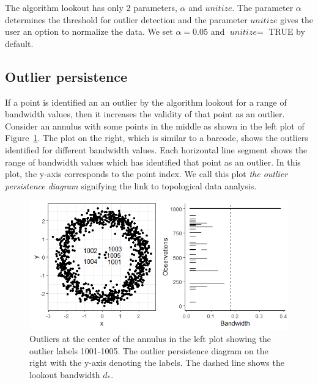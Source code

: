 \documentclass[letter,12pt]{article}
\begin{document}
The algorithm lookout has only 2 parameters, $\alpha$ and $\textit{unitize}$. The parameter $\alpha$ determines the threshold for outlier detection and the parameter $\textit{unitize}$ gives the user an option to normalize the data. We set $\alpha= 0.05$ and $\textit{unitize} =$ TRUE by default.


\subsection{Outlier persistence}\label{subsec:persistence}
If a point is identified an an outlier by the algorithm lookout for a range of bandwidth values, then it increases the validity of that point as an outlier. Consider an annulus with some points in the middle as shown in the left plot of Figure~\ref{fig:outlierpersistence}. The plot on the right, which is similar to a barcode,  shows the outliers identified for different bandwidth values. Each horizontal line segment shows the range of bandwidth values which has identified that point as an outlier. 
In this plot, the y-axis corresponds to the point index. We call this plot \textit{the outlier persistence diagram} signifying the link to topological data analysis. 

\begin{figure}[!ht]
    \centering
    \includegraphics[scale=0.8]{Outlier_Persistence.png}
    \caption{Outliers at the center of the annulus in the left plot showing the outlier labels 1001-1005. The outlier persistence diagram on the right with the y-axis denoting the labels. The dashed line shows the lookout bandwidth $d_*$.}
    \label{fig:outlierpersistence}
\end{figure}
\end{document}
